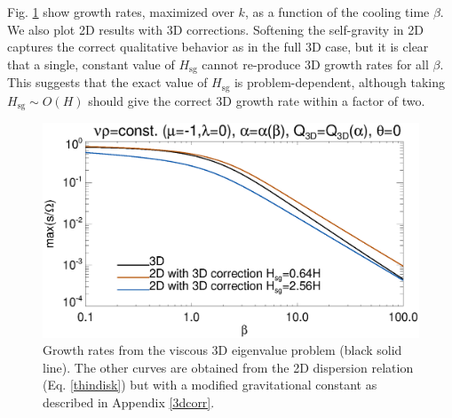 Fig. \ref{3d_visc} show growth rates, maximized over $k$, as a
function of the cooling time $\beta$. We also plot 2D results with 3D
corrections. Softening the self-gravity in 2D captures the correct 
qualitative behavior as in the full 3D case, but it is clear that a
single, constant value of $H_\mathrm{sg}$ cannot re-produce 3D growth 
rates for all $\beta$. 
This suggests that the exact value of
$H_\mathrm{sg}$ is problem-dependent, although taking
$H_\mathrm{sg}\sim O(H)$ should give the correct 3D growth rate within
a factor of two. 


 

\begin{figure}
  \includegraphics[width=\linewidth,clip=true,trim=0cm 0.cm 0.23cm
    0.0cm]{figures/growth_visc3d}
  \caption{Growth rates from the viscous 3D eigenvalue problem (black solid
    line). The other curves are obtained from the 2D dispersion
    relation (Eq. \ref{thindisk}) but with a modified gravitational
    constant as described in Appendix \ref{3dcorr}. \label{3d_visc}}
\end{figure}
